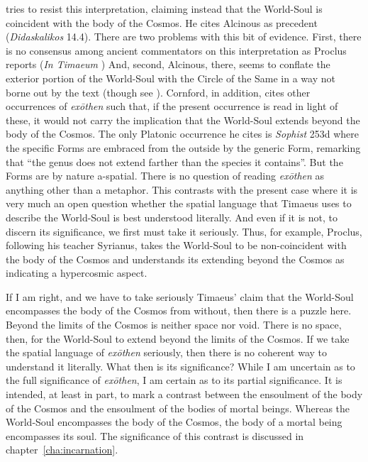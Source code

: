 \citet[58]{Cornford:1935fk} tries to resist this interpretation, claiming instead that the World-Soul is coincident with the body of the Cosmos. He cites Alcinous as precedent (\emph{Didaska\-likos} 14.4). There are two problems with this bit of evidence. First, there is no consensus among ancient commentators on this interpretation as Proclus reports (\emph{In Timaeum} ) And, second, Alcinous, there, seems to conflate the exterior portion of the World-Soul with the Circle of the Same in a way not borne out by the text (though see \citealt[105]{Taylor:1928qb}). Cornford, in addition, cites other occurrences of \emph{exōthen} such that, if the present occurrence is read in light of these, it would not carry the implication that the World-Soul extends beyond the body of the Cosmos. The only Platonic occurrence he cites is \emph{Sophist} 253d where the specific Forms are embraced from the outside by the generic Form, remarking that ``the genus does not extend farther than the species it contains''. But the Forms are by nature a-spatial. There is no question of reading \emph{exōthen} as anything other than a metaphor. This contrasts with the present case where it is very much an open question whether the spatial language that Timaeus uses to describe the World-Soul is best understood literally. And even if it is not, to discern its significance, we first must take it seriously. Thus, for example, Proclus, following his teacher Syrianus, takes the World-Soul to be non-coincident with the body of the Cosmos and understands its extending beyond the Cosmos as indicating a hypercosmic aspect.

If I am right, and we have to take seriously Timaeus' claim that the World-Soul encompasses the body of the Cosmos from without, then there is a puzzle here. Beyond the limits of the Cosmos is neither space nor void. There is no space, then, for the World-Soul to extend beyond the limits of the Cosmos. If we take the spatial language of \emph{exōthen} seriously, then there is no coherent way to understand it literally. What then is its significance? While I am uncertain as to the full significance of \emph{exōthen}, I am certain as to its partial significance. It is intended, at least in part, to mark a contrast between the ensoulment of the body of the Cosmos and the ensoulment of the bodies of mortal beings. Whereas the World-Soul encompasses the body of the Cosmos, the body of a mortal being encompasses its soul. The significance of this contrast is discussed in chapter~\ref{cha:incarnation}.

